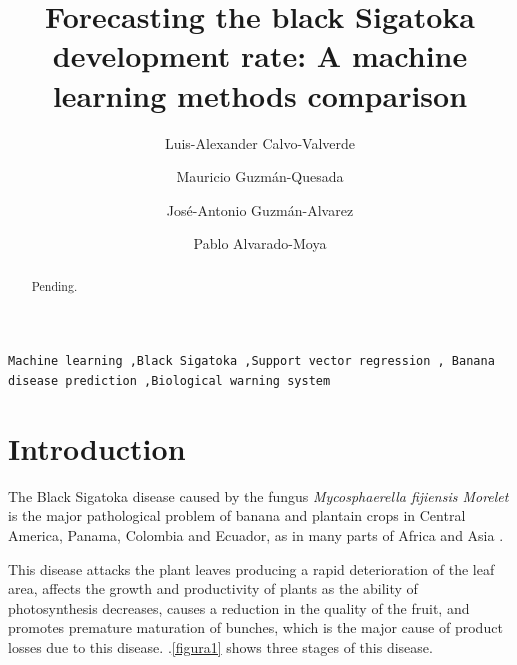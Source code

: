 \documentclass[review]{elsarticle}
\begin{document}
\begin{frontmatter}

\title{Forecasting the black Sigatoka development rate: A machine learning methods comparison 
}

\author[afiLuisAlex]{Luis-Alexander Calvo-Valverde}

\author[afiCorbana] {Mauricio Guzm\'an-Quesada}
\author[afiCorbana]{Jos\'e-Antonio Guzm\'an-Alvarez}
\author[afiPablo]{Pablo Alvarado-Moya}

\address[afiLuisAlex]{DOCINADE, Instituto Tecnol\'ogico de Costa Rica, 
Computer Research Center, Multidisciplinar program eScience, 
CNCA/CeNAT, Cartago, Costa Rica}

\address[afiCorbana]{Direcci\'on de Investigaciones, Corporaci\'on Bananera Nacional S.A., Gu\'apiles, Costa Rica}

\address[afiPablo]{DOCINADE, Instituto Tecnol\'ogico de Costa Rica, Cartago, Costa Rica}




\begin{abstract}
Pending.
\end{abstract}

\begin{keyword}
\texttt{Machine learning \sep Black Sigatoka \sep Support vector regression \sep
Banana disease prediction \sep Biological warning system }
\end{keyword}

\end{frontmatter}

\linenumbers

\section{Introduction}

The Black Sigatoka disease caused by the fungus {\it Mycosphaerella
  fijiensis Morelet} is the major pathological problem of banana and
plantain crops in Central America, Panama, Colombia and Ecuador, as in
many parts of Africa and Asia \citep{MarinVargas1995}.

This disease attacks the plant leaves producing a rapid deterioration
of the leaf area, affects the growth and productivity of plants as the
ability of photosynthesis decreases, causes a reduction in the quality
of the fruit, and promotes premature maturation of bunches, which is
the major cause of product losses due to this disease. \figurename
$.$\ref{figura1} shows three stages of this disease.
\end{document}
